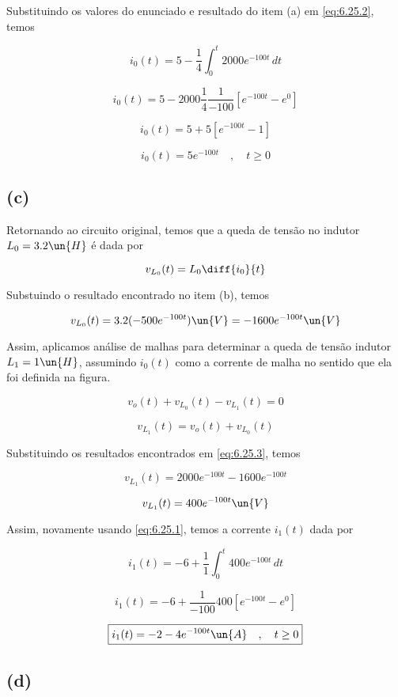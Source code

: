 Substituindo os valores do enunciado e resultado do item (a) em \eqref{eq:6.25.2}, temos

\[ i_0(t) = 5 - \frac{1}{4}\int_{0}^{t} 2000e^{-100t} \,dt  \]

\[ i_0(t) = 5 - 2000\frac{1}{4}\frac{1}{-100}\left[e^{-100t} - e^{0}\right]  \]

\[ i_0(t) = 5 + 5\left[e^{-100t} - 1\right]  \]

\[ \boxed{i_0(t) = 5e^{-100t} \quad ,  \quad t \geq 0}  \]

\subsection*{(c)}

Retornando ao circuito original, temos que a queda de tensão no indutor $L_0 = 3.2\un{H}$ é dada por

\[ v_{L_0}(t) = L_0\diff{i_0}{t} \]

Substuindo o resultado encontrado no item (b), temos

\[ v_{L_0}(t) = 3.2(-500e^{-100t}) \un{V} = -1600e^{-100t} \un{V} \]

Assim, aplicamos análise de malhas para determinar a queda de tensão indutor $L_1 = 1 \un{H}$, assumindo
$i_0(t)$ como a corrente de malha no sentido que ela foi definida na figura.

\[ v_o(t) + v_{L_0}(t) - v_{L_1}(t) = 0 \]

\begin{equation}\label{eq:6.25.3}
    v_{L_1}(t) = v_o(t) + v_{L_0}(t)
\end{equation}

Substituindo os resultados encontrados em \eqref{eq:6.25.3}, temos

\[ v_{L_1}(t) = 2000e^{-100t} - 1600e^{-100t} \]

\[ v_{L_1}(t) = 400e^{-100t} \un{V} \]

Assim, novamente usando \eqref{eq:6.25.1}, temos a corrente $i_1(t)$ dada por 

\[ i_1(t) = -6 + \frac{1}{1}\int_{0}^{t} 400e^{-100t} \,dt  \]

\[ i_1(t) = -6 + \frac{1}{-100}400 \left[e^{-100t} - e^0\right]  \]

\[ \boxed{i_1(t) = -2 -4 e^{-100t} \un{A} \quad ,  \quad t \geq 0}  \]

\subsection*{(d)}


